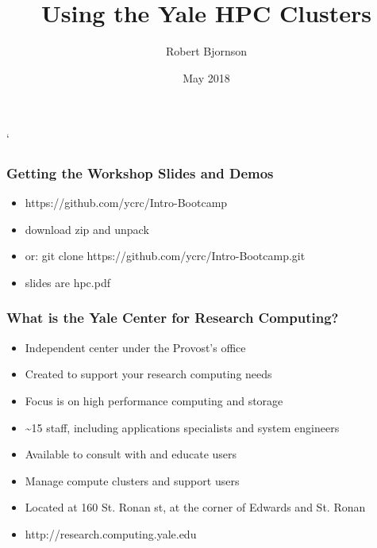\documentclass[10pt]{beamer}
\begin{document}
\title{Using the Yale HPC Clusters}`
\author{{Robert Bjornson}}
\date{May 2018}

\begin{frame}[plain]
  \titlepage
\end{frame}

\begin{frame}[fragile]
\frametitle{Getting the Workshop Slides and Demos}
\begin{itemize}
\item https://github.com/ycrc/Intro-Bootcamp
\item download zip and unpack
\item or: git clone https://github.com/ycrc/Intro-Bootcamp.git
\item slides are hpc.pdf
\end{itemize}
\end{frame}

\begin{frame}[fragile]
\frametitle{What is the Yale Center for Research Computing?}

\begin{itemize}
\item Independent center under the Provost's office
\item Created to support your research computing needs
\item Focus is on high performance computing and storage
\item \textasciitilde 15 staff, including applications specialists and system engineers
\item Available to consult with and educate users
\item Manage compute clusters and support users
\item Located at 160 St. Ronan st, at the corner of Edwards and St. Ronan
\item http://research.computing.yale.edu
\end{itemize}

\end{frame}
\end{document}
